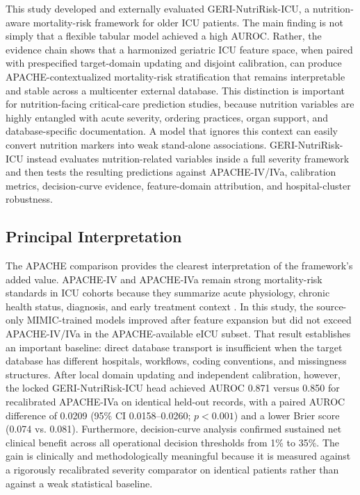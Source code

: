 \documentclass[utf8]{FrontiersinVancouver}
\newcommand{\re}[1]{#1}
\begin{document}
This study developed and externally evaluated GERI-NutriRisk-ICU, a nutrition-aware mortality-risk framework for older ICU patients. The main finding is not simply that a flexible tabular model achieved a high AUROC. Rather, the evidence chain shows that a harmonized geriatric ICU feature space, when paired with prespecified target-domain updating and disjoint calibration, can produce APACHE-contextualized mortality-risk stratification that remains interpretable and stable across a multicenter external database. This distinction is important for nutrition-facing critical-care prediction studies, because nutrition variables are highly entangled with acute severity, ordering practices, organ support, and database-specific documentation. A model that ignores this context can easily convert nutrition markers into weak stand-alone associations. GERI-NutriRisk-ICU instead evaluates nutrition-related variables inside a full severity framework and then tests the resulting predictions against APACHE-IV/IVa, calibration metrics, decision-curve evidence, feature-domain attribution, and hospital-cluster robustness.

\subsection{Principal Interpretation}
The APACHE comparison provides the clearest interpretation of the framework's added value. APACHE-IV and APACHE-IVa remain strong mortality-risk standards in ICU cohorts because they summarize acute physiology, chronic health status, diagnosis, and early treatment context \citep{Zimmerman2006ApacheIV}. In this study, the source-only MIMIC-trained models improved after feature expansion but did not exceed APACHE-IV/IVa in the APACHE-available eICU subset. That result establishes an important baseline: direct database transport is insufficient when the target database has different hospitals, workflows, coding conventions, and missingness structures. \re{After local domain updating and independent calibration, however, the locked GERI-NutriRisk-ICU head achieved AUROC 0.871 versus 0.850 for recalibrated APACHE-IVa on identical held-out records, with a paired AUROC difference of 0.0209 (95\% CI 0.0158--0.0260; $p<0.001$) and a lower Brier score (0.074 vs. 0.081). Furthermore, decision-curve analysis confirmed sustained net clinical benefit across all operational decision thresholds from 1\% to 35\%. The gain is clinically and methodologically meaningful because it is measured against a rigorously recalibrated severity comparator on identical patients rather than against a weak statistical baseline.}
\end{document}
